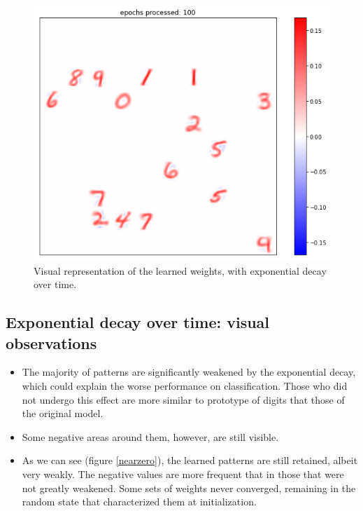 \documentclass[a4paper]{report}
\begin{document}
\begin{figure} [H]
\centering
\includegraphics [width=12cm ] {h/cento.png}
\caption{Visual representation of the learned weights, with exponential decay over time.}
\label{decay}
\end{figure}

\subsection{Exponential decay over time: visual observations}

\begin{itemize}
    \item The majority of patterns are significantly weakened by the exponential decay, which could explain the worse performance on classification. Those who did not undergo this effect are more similar to prototype of digits that those of the original model.
    \item Some negative areas around them, however, are still visible.
    \item As we can see (figure \ref{nearzero}), the learned patterns are still retained, albeit very weakly. The negative values are more frequent that in those that were not greatly weakened. Some sets of weights never converged, remaining in the random state that characterized them at initialization.
\end{itemize}
\end{document}
